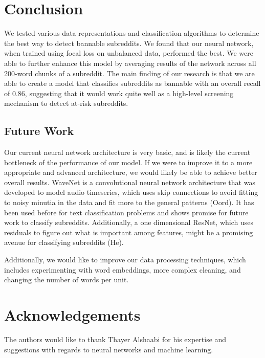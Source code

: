 \documentclass[11pt]{article}[twocolumn]
\begin{document}
\section{Conclusion}
We tested various data representations and classification algorithms to determine the best way to detect bannable subreddits. We found that our neural network, when trained using focal loss on unbalanced data, performed the best. We were able to further enhance this model by averaging results of the network across all 200-word chunks of a subreddit. The main finding of our research is that we are able to create a model that classifies subreddits as bannable with an overall recall of 0.86, suggesting that it would work quite well as a high-level screening mechanism to detect at-risk subreddits.


\subsection{Future Work}
Our current neural network architecture is very basic, and is likely the current bottleneck of the performance of our model. If we were to improve it to a more appropriate and advanced architecture, we would likely be able to achieve better overall results. WaveNet is a convolutional neural network architecture that was developed to model audio timeseries, which uses skip connections to avoid fitting to noisy minutia in the data and fit more to the general patterns (Oord).  It has been used before for text classification problems and shows promise for future work to classify subreddits.  Additionally, a one dimensional ResNet, which uses residuals to figure out what is important among features, might be a promising avenue for classifying subreddits (He).


Additionally, we would like to improve our data processing techniques, which includes experimenting with word embeddings, more complex cleaning, and changing the number of words per unit.



\section{Acknowledgements}
The authors would like to thank Thayer Alshaabi for his expertise and suggestions with regards to neural networks and machine learning.
\end{document}
